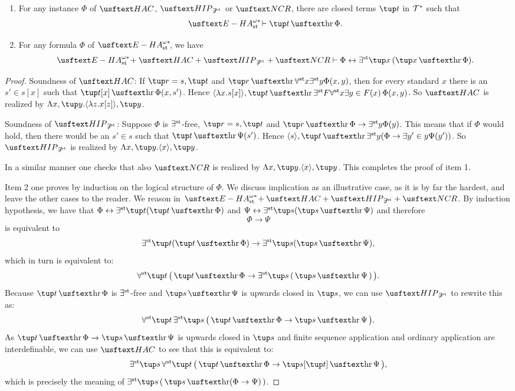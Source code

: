\begin{thm}
\qquad 
\begin{enumerate}
\item For any instance $\Phi$ of $\HAC$, $\HIP_{\not\exists^{\st}}$ or $\NCR$, there are closed terms $\tup t$ in $\mathcal{T}^*$ such that \[ \ehaststar \vdash \tup t \hr \Phi. \]
\item For any formula $\Phi$ of $\ehaststar$, we have
\[ \ehaststar + \HAC + \HIP_{\not\exists^{\st}} +\NCR \vdash \Phi \leftrightarrow \existsst \tup x \, ( \tup x \hr \Phi). \]
\end{enumerate}
\end{thm}
\begin{proof}
Soundness of $\HAC$: If $\tup r = s, \tup t$ and $\tup r \hr \forallst x\existsst y \Phi(x,y)$, then for every standard $x$ there is an $s' \in s[x]$ such that $\tup t[x] \hr \Phi(x, s')$. Hence $\langle \lambda x. s[x] \rangle, \tup t \hr \existsst F \forallst x \exists y \in F(x) \,  \Phi (x,y)$. So $\HAC$ is realized by $\Lambda x, \tup y.\langle \lambda z. x[z] \rangle, \tup y$.

Soundness of $\HIP_{\not\exists^{\st}}$: Suppose $\Phi$ is $\exists^{\operatorname{st}{}}\!$-free, $\tup r = s, \tup t$ and $\tup r \hr \Phi \to \existsst y \Phi(y)$. This means that if $\Phi$ would hold, then there would be an $s' \in s$ such that $\tup t \hr \Psi(s')$. Hence $\langle s \rangle, \tup t \hr \existsst y (\Phi \to \exists y' \in y \Psi(y'))$. So  $\HIP_{\not\exists^{\st}}$ is realized by $\Lambda x, \tup y.\langle x \rangle, \tup y$.

In a similar manner one checks that also $\NCR$ is realized by $\Lambda x, \tup y.\langle x \rangle, \tup y$. This completes the proof of item 1.

Item 2 one proves by induction on the logical structure of $\Phi$. We discuss implication as an illustrative case, as it is by far the hardest, and leave the other cases to the reader. We reason in $\ehaststar + \HAC + \HIP_{\not\exists^{\st}} +\NCR$. By induction hypothesis, we have that $\Phi \leftrightarrow \existsst \tup t (\tup t \hr \Phi)$ and $\Psi \leftrightarrow \existsst \tup s (\tup s \hr \Psi)$ and therefore
\[ \Phi \to \Psi \]
is equivalent to
\[ \existsst \tup t (\tup t \hr \Phi) \to \existsst \tup s (\tup s \hr \Psi), \]
which in turn is equivalent to:
\[ \forallst \tup t \, \big( \, \tup t \hr \Phi \to \existsst \tup s \, ( \, \tup s \hr \Psi \, ) \, \big). \]
Because $\tup t \hr \Phi$ is $\exists^{\operatorname{st}{}}\!$-free and $\tup s \hr \Psi$ is upwards closed in $\tup s$, we can use $\HIP_{\not\exists^{\st}}$ to rewrite this as:
\[ \forallst \tup t \, \existsst \tup s \, \big( \, \tup t \hr \Phi \to \tup s \hr \Psi \, \big). \]
As $\tup t \hr \Phi \to \tup s \hr \Psi$ is upwards closed in $\tup s$ and finite sequence application and ordinary application are interdefinable, we can use $\HAC$ to see that this is equivalent to:
\[ \existsst \tup s \, \forallst \tup t \, \big( \, \tup t \hr \Phi \to \tup s[\tup t] \hr \Psi \, \big), \]
which is precisely the meaning of $\existsst \tup s \, ( \, \tup s \hr (\Phi \to \Psi) \, )$.
\end{proof}


